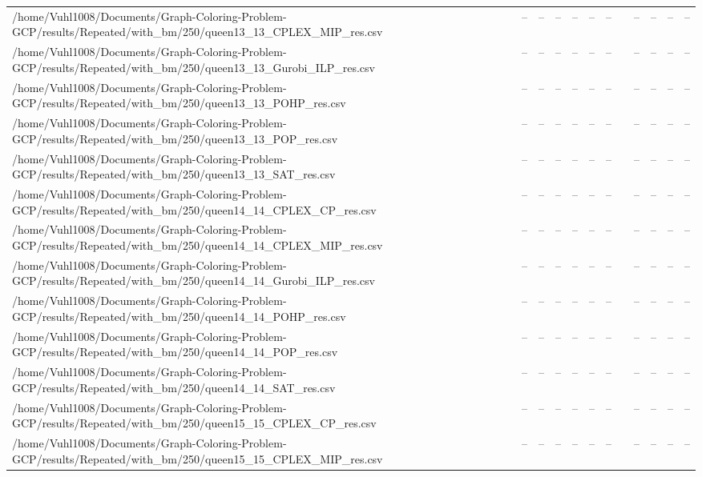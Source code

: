 \begin{table}[htbp]
\begin{tabular}{llllllllllll}
/home/Vuhl1008/Documents/Graph-Coloring-Problem-GCP/results/Repeated/with\_bm/250/queen13\_13\_CPLEX\_MIP\_res.csv & -- & -- & -- & -- & -- & -- & {} & -- & -- & -- & -- \\
/home/Vuhl1008/Documents/Graph-Coloring-Problem-GCP/results/Repeated/with\_bm/250/queen13\_13\_Gurobi\_ILP\_res.csv & -- & -- & -- & -- & -- & -- & {} & -- & -- & -- & -- \\
/home/Vuhl1008/Documents/Graph-Coloring-Problem-GCP/results/Repeated/with\_bm/250/queen13\_13\_POHP\_res.csv & -- & -- & -- & -- & -- & -- & {} & -- & -- & -- & -- \\
/home/Vuhl1008/Documents/Graph-Coloring-Problem-GCP/results/Repeated/with\_bm/250/queen13\_13\_POP\_res.csv & -- & -- & -- & -- & -- & -- & {} & -- & -- & -- & -- \\
/home/Vuhl1008/Documents/Graph-Coloring-Problem-GCP/results/Repeated/with\_bm/250/queen13\_13\_SAT\_res.csv & -- & -- & -- & -- & -- & -- & {} & -- & -- & -- & -- \\
/home/Vuhl1008/Documents/Graph-Coloring-Problem-GCP/results/Repeated/with\_bm/250/queen14\_14\_CPLEX\_CP\_res.csv & -- & -- & -- & -- & -- & -- & {} & -- & -- & -- & -- \\
/home/Vuhl1008/Documents/Graph-Coloring-Problem-GCP/results/Repeated/with\_bm/250/queen14\_14\_CPLEX\_MIP\_res.csv & -- & -- & -- & -- & -- & -- & {} & -- & -- & -- & -- \\
/home/Vuhl1008/Documents/Graph-Coloring-Problem-GCP/results/Repeated/with\_bm/250/queen14\_14\_Gurobi\_ILP\_res.csv & -- & -- & -- & -- & -- & -- & {} & -- & -- & -- & -- \\
/home/Vuhl1008/Documents/Graph-Coloring-Problem-GCP/results/Repeated/with\_bm/250/queen14\_14\_POHP\_res.csv & -- & -- & -- & -- & -- & -- & {} & -- & -- & -- & -- \\
/home/Vuhl1008/Documents/Graph-Coloring-Problem-GCP/results/Repeated/with\_bm/250/queen14\_14\_POP\_res.csv & -- & -- & -- & -- & -- & -- & {} & -- & -- & -- & -- \\
/home/Vuhl1008/Documents/Graph-Coloring-Problem-GCP/results/Repeated/with\_bm/250/queen14\_14\_SAT\_res.csv & -- & -- & -- & -- & -- & -- & {} & -- & -- & -- & -- \\
/home/Vuhl1008/Documents/Graph-Coloring-Problem-GCP/results/Repeated/with\_bm/250/queen15\_15\_CPLEX\_CP\_res.csv & -- & -- & -- & -- & -- & -- & {} & -- & -- & -- & -- \\
/home/Vuhl1008/Documents/Graph-Coloring-Problem-GCP/results/Repeated/with\_bm/250/queen15\_15\_CPLEX\_MIP\_res.csv & -- & -- & -- & -- & -- & -- & {} & -- & -- & -- & -- \\

\end{tabular}
\end{table}
